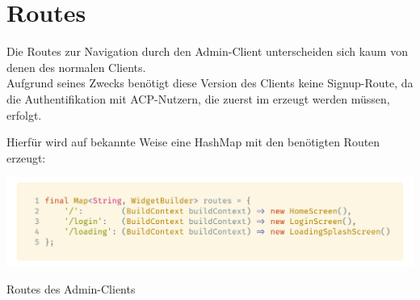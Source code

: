 \section{Routes}

Die Routes zur Navigation durch den Admin-Client unterscheiden sich kaum von denen des normalen
Clients.\\
Aufgrund seines Zwecks benötigt diese Version des Clients keine Signup-Route, da die
Authentifikation mit ACP-Nutzern, die zuerst im  erzeugt werden müssen, erfolgt.

Hierfür wird auf bekannte Weise eine HashMap mit den benötigten Routen erzeugt:

\begin{code}[H]
    \centering
    \includegraphics[width=1\textwidth]{images/Admin-Client/util/routes.png}
    \vspace{-25pt}
    \caption{Routes des Admin-Clients}
\end{code}